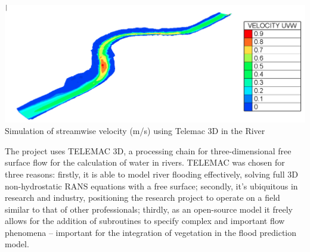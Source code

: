 \documentclass[11pt]{article}%
\begin{document}
\begin{minipage}[t]{.75\linewidth}
\begin{multicols}{2}
\includegraphics[width=1\linewidth]{simon/projectPict.png}
{\scriptsize Simulation of streamwise velocity (m/s) using Telemac 3D in the River }

The project uses TELEMAC 3D, a processing chain for three-dimensional free surface flow for the calculation of water in rivers. TELEMAC was chosen for three reasons: firstly, it is able to model river flooding effectively, solving full 3D non-hydrostatic RANS equations with a free surface; 
secondly, it’s ubiquitous in research and industry, positioning the research project to operate on a field similar to that of other professionals; thirdly, as an open-source model it freely allows for the addition of subroutines to specify complex and important flow phenomena – important for the integration of vegetation in the flood prediction model.

\end{multicols}
\end{minipage}




\cleardoublepage
\end{document}
